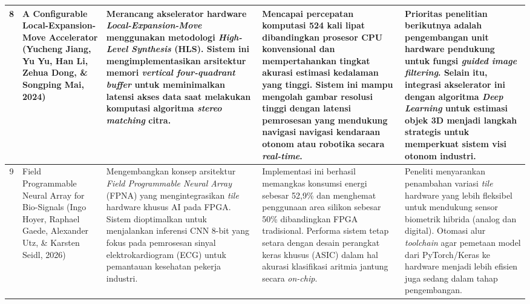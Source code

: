 \documentclass[12pt,a4paper]{article}
\begin{document}
\begin{small}
\begin{longtable}{|c|>{\raggedright\arraybackslash}p{3cm}|>{\raggedright\arraybackslash}p{4cm}|>{\raggedright\arraybackslash}p{4cm}|>{\raggedright\arraybackslash}p{4cm}|}
8 & A Configurable Local-Expansion-Move Accelerator (Yucheng Jiang, Yu Yu, Han Li, Zehua Dong, \& Songping Mai, 2024) & Merancang akselerator hardware \textit{Local-Expansion-Move} menggunakan metodologi \textit{High-Level Synthesis} (HLS). Sistem ini mengimplementasikan arsitektur memori \textit{vertical four-quadrant buffer} untuk meminimalkan latensi akses data saat melakukan komputasi algoritma \textit{stereo matching} citra. & Mencapai percepatan komputasi 524 kali lipat dibandingkan prosesor CPU konvensional dan mempertahankan tingkat akurasi estimasi kedalaman yang tinggi. Sistem ini mampu mengolah gambar resolusi tinggi dengan latensi pemrosesan yang mendukung navigasi navigasi kendaraan otonom atau robotika secara \textit{real-time}. & Prioritas penelitian berikutnya adalah pengembangan unit hardware pendukung untuk fungsi \textit{guided image filtering}. Selain itu, integrasi akselerator ini dengan algoritma \textit{Deep Learning} untuk estimasi objek 3D menjadi langkah strategis untuk memperkuat sistem visi otonom industri. \\ \hline

9 & Field Programmable Neural Array for Bio-Signals (Ingo Hoyer, Raphael Gaede, Alexander Utz, \& Karsten Seidl, 2026) & Mengembangkan konsep arsitektur \textit{Field Programmable Neural Array} (FPNA) yang mengintegrasikan \textit{tile} hardware khusus AI pada FPGA. Sistem dioptimalkan untuk menjalankan inferensi CNN 8-bit yang fokus pada pemrosesan sinyal elektrokardiogram (ECG) untuk pemantauan kesehatan pekerja industri. & Implementasi ini berhasil memangkas konsumsi energi sebesar 52,9\% dan menghemat penggunaan area silikon sebesar 50\% dibandingkan FPGA tradisional. Performa sistem tetap setara dengan desain perangkat keras khusus (ASIC) dalam hal akurasi klasifikasi aritmia jantung secara \textit{on-chip}. & Peneliti menyarankan penambahan variasi \textit{tile} hardware yang lebih fleksibel untuk mendukung sensor biometrik hibrida (analog dan digital). Otomasi alur \textit{toolchain} agar pemetaan model dari PyTorch/Keras ke hardware menjadi lebih efisien juga sedang dalam tahap pengembangan. \\ \hline


\end{longtable}
\end{small}
\end{document}
